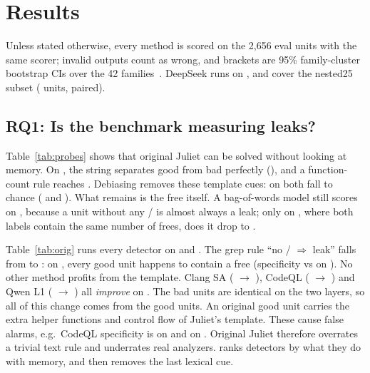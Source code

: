 \section{Results}\label{sec:results}

Unless stated otherwise, every method is scored on the 2,656 \Deb{} eval units with the same scorer;
invalid outputs count as wrong, and brackets are 95\% family-cluster bootstrap CIs
over the 42 families~\cite{efron1979}.
DeepSeek runs on \Dead, \Plac{} and \Orig{} cover the nested25 subset ( units, paired).

\subsection{RQ1: Is the benchmark measuring leaks?}\label{sec:rq1}

Table~\ref{tab:probes} shows that original Juliet can be solved without looking at memory.
On \Orig, the string  separates good from bad perfectly
(),
and a function-count rule reaches .
Debiasing removes these template cues: on \Deb{} both fall to chance
( and ).
What remains is the free itself.
A bag-of-words model still scores  on \Deb,
because a unit without any / is almost always a leak;
only on \Dead, where both labels contain the same number of frees, does it drop to .



Table~\ref{tab:orig} runs every detector on \Orig{} and \Deb.
The grep rule ``no / $\Rightarrow$ leak'' falls from
 to :
on \Orig, every good unit happens to contain a free
(specificity  vs  on \Deb).
No other method profits from the template.
Clang SA ( $\rightarrow$ ),
CodeQL ( $\rightarrow$ )
and Qwen L1 ( $\rightarrow$ )
all \emph{improve} on \Deb.
The bad units are identical on the two layers, so all of this change comes from the good units.
An original good unit carries the extra helper functions and control flow of Juliet's template.
These cause false alarms, e.g.\ CodeQL specificity is  on \Orig
and  on \Deb.
Original Juliet therefore overrates a trivial text rule and underrates real analyzers.
\Deb{} ranks detectors by what they do with memory, and \Dead{} then removes the last lexical cue.

